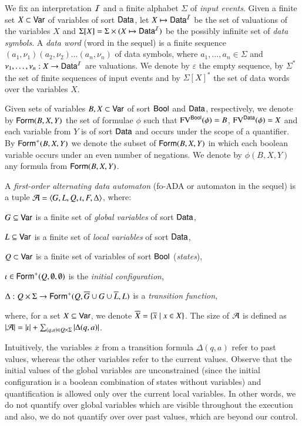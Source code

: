 \documentclass{llncs}
\begin{document}
We fix an interpretation $\mathcal{I}$ and a finite alphabet $\Sigma$ of
\emph{input events}. Given a finite set $X \subset \mathsf{Var}$ of
variables of sort $\mathsf{Data}$, let $X \mapsto \mathsf{Data}^{\mathcal{I}}$ be the set
of valuations of the variables $X$ and $\Sigma[X] = \Sigma
\times (X \mapsto \mathsf{Data}^{\mathcal{I}})$ be the possibly infinite set of
\emph{data symbols}. A \emph{data word} (word in the sequel) is a
finite sequence $(a_1,\nu_1)(a_2,\nu_2) \ldots (a_n,\nu_n)$ of data
symbols, where $a_1,\ldots,a_n \in \Sigma$ and $\nu_1,\ldots,\nu_n :
X \rightarrow \mathsf{Data}^{\mathcal{I}}$ are valuations. We denote by
$\varepsilon$ the empty sequence, by $\Sigma^*$ the set of finite
sequences of input events and by $\Sigma[X]^*$ the set of data
words over the variables $X$.

Given sets of variables $B,X \subset \mathsf{Var}$ of sort $\mathsf{Bool}$ and
$\mathsf{Data}$, respectively, we denote by $\mathsf{Form}(B,X,Y)$ the set of formulae
$\phi$ such that $\mathrm{FV}^{\mathsf{Bool}}(\phi) = B$, $\mathrm{FV}^{\mathsf{Data}}(\phi) = X$ and
each variable from $Y$ is of sort $\mathsf{Data}$ and occurs under the scope
of a quantifier. By $\mathsf{Form}^+(B,X,Y)$ we denote the subset of
$\mathsf{Form}(B,X,Y)$ in which each boolean variable occurs under an even
number of negations. We denote by $\phi(B,X,Y)$ any formula from
$\mathsf{Form}(B,X,Y)$. 

A \emph{first-order alternating data automaton} (fo-ADA or automaton
in the sequel) is a tuple $\mathcal{A} =
\left\langle G,L,Q,\iota,F,\Delta \right\rangle$, where: \begin{compactitem}
%
\item $G \subseteq \mathsf{Var}$ is a finite set of \emph{global
  variables} of sort $\mathsf{Data}$, 
%
\item $L \subseteq \mathsf{Var}$ is a finite set of \emph{local
  variables} of sort $\mathsf{Data}$,
%
\item $Q \subset \mathsf{Var}$ is a finite set of variables of sort $\mathsf{Bool}$
  (\emph{states}),
%
\item $\iota \in \mathsf{Form}^+(Q,\emptyset,\emptyset)$ is the \emph{initial
  configuration},
%
\item $\Delta : Q \times \Sigma \rightarrow
  \mathsf{Form}^+(Q,\overline{G}\cup G\cup\overline{L},L)$
  is a \emph{transition function},
\end{compactitem}
where, for a set $X \subseteq \mathsf{Var}$, we denote $\overline{X} =
\left\{ \overline{x} \mid x \in X \right\}$. The size of $\mathcal{A}$ is defined as
${|{\mathcal{A}}|} = {|{\iota}|} + \sum_{(q,a) \in
  Q\times\Sigma}{|{\Delta(q,a)}|}$.

Intuitively, the variables $\overline{x}$ from a transition formula
$\Delta(q,a)$ refer to past values, whereas the other variables refer
to the current values. Observe that the initial values of the global
variables are unconstrained (since the initial configuration is a
boolean combination of states without variables) and quantification is
allowed only over the current local variables. In other words, we do
not quantify over global variables which are visible throughout the
execution and also, we do not quantify over over past values, which
are beyond our control.
\end{document}
